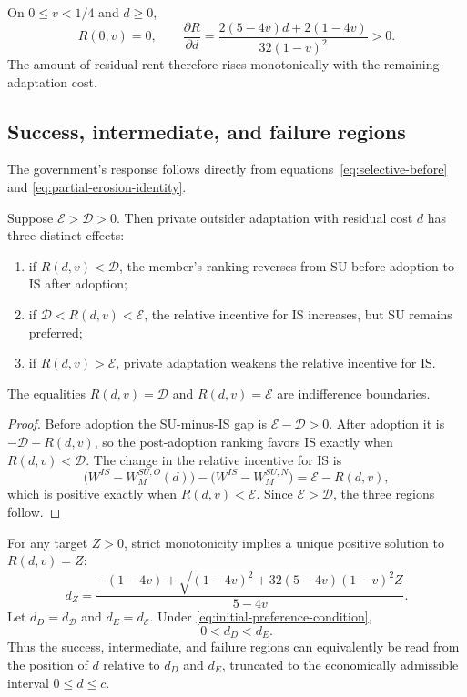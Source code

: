 On $0\leq v<1/4$ and $d\geq0$,
\begin{equation}
    R(0,v)=0,
    \qquad
    \frac{\partial R}{\partial d}
    =
    \frac{2(5-4v)d+2(1-4v)}
         {32(1-v)^2}>0.
    \label{eq:residual-rent-monotonicity}
\end{equation}
The amount of residual rent therefore rises monotonically with the remaining adaptation cost.

\subsection{Success, intermediate, and failure regions}
\label{subsec:residual-rent-regions}

The government's response follows directly from equations~\eqref{eq:selective-before} and \eqref{eq:partial-erosion-identity}.

\begin{proposition}
\label{thm:selective-erosion}
Suppose $\mathscr E>\mathscr D>0$. Then private outsider adaptation with residual cost $d$ has three distinct effects:
\begin{enumerate}
    \item if $R(d,v)<\mathscr D$, the member's ranking reverses from SU before adoption to IS after adoption;
    \item if $\mathscr D<R(d,v)<\mathscr E$, the relative incentive for IS increases, but SU remains preferred;
    \item if $R(d,v)>\mathscr E$, private adaptation weakens the relative incentive for IS.
\end{enumerate}
The equalities $R(d,v)=\mathscr D$ and $R(d,v)=\mathscr E$ are indifference boundaries.
\end{proposition}

\begin{proof}
Before adoption the SU-minus-IS gap is $\mathscr E-\mathscr D>0$. After adoption it is $-\mathscr D+R(d,v)$, so the post-adoption ranking favors IS exactly when $R(d,v)<\mathscr D$. The change in the relative incentive for IS is
\[
\bigl(W^{IS}-W_M^{SU,O}(d)\bigr)
-
\bigl(W^{IS}-W_M^{SU,N}\bigr)
=
\mathscr E-R(d,v),
\]
which is positive exactly when $R(d,v)<\mathscr E$. Since $\mathscr E>\mathscr D$, the three regions follow.
\end{proof}

For any target $Z>0$, strict monotonicity implies a unique positive solution to $R(d,v)=Z$:
\begin{equation}
    d_Z
    =
    \frac{
      -(1-4v)+
      \sqrt{(1-4v)^2+32(5-4v)(1-v)^2Z}
    }{5-4v}.
    \label{eq:residual-cost-threshold}
\end{equation}
Let $d_D=d_{\mathscr D}$ and $d_E=d_{\mathscr E}$. Under \eqref{eq:initial-preference-condition},
\[
0<d_D<d_E.
\]
Thus the success, intermediate, and failure regions can equivalently be read from the position of $d$ relative to $d_D$ and $d_E$, truncated to the economically admissible interval $0\leq d\leq c$.

